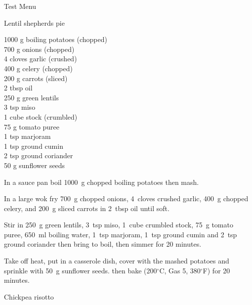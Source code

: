 \begin{menu}{Test Menu}
\begin{recipe}{2}{Lentil shepherds pie}
		\begin{ingredients}
		1000 g boiling potatoes (chopped) \\
	700 g onions (chopped) \\
	4 cloves garlic (crushed) \\
	400 g celery (chopped) \\
	200 g carrots (sliced) \\
	2 tbsp oil  \\
	250 g green lentils  \\
	3 tsp miso  \\
	1 cube stock (crumbled) \\
	75 g tomato puree  \\
	1 tsp marjoram  \\
	1 tsp ground cumin  \\
	2 tsp ground coriander  \\
	50 g sunflower seeds  \\
	
		\end{ingredients}
	
	
    \begin{instructions}
    \item 
        In a sauce pan boil
        1000~g chopped boiling potatoes
        then mash.
      \item 
        In a large wok fry
        700~g chopped onions,
        4~cloves crushed garlic,
        400~g chopped celery,
        and
        200~g sliced carrots
        in
        2~tbsp  oil
        until soft.
      \item 
        Stir in
        250~g  green lentils,
        3~tsp  miso,
        1~cube crumbled stock,
        75~g  tomato puree,
        650~ml  boiling water,
        1~tsp  marjoram,
        1~tsp  ground cumin
        and
        2~tsp  ground coriander
        then bring to boil,
        then simmer for 20 minutes.
      \item 
        Take off heat,
        put in a casserole dish,
        cover with the mashed potatoes
        and sprinkle with
        50~g  sunflower seeds.
        then bake 
      (200$^{\circ}$C, Gas 5, 380$^{\circ}$F)
     for 20 minutes.
      
    \end{instructions}
    \end{recipe}%
  
    \begin{recipe}{2}{Chickpea risotto}%
    

\end{recipe}
\end{menu}
